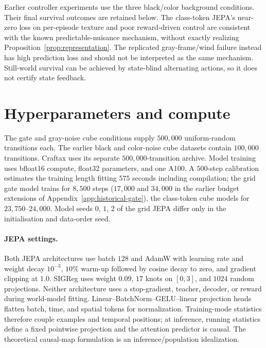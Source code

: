 Earlier controller experiments use the three black/color background conditions. Their final
survival outcomes are retained below. The class-token JEPA's near-zero loss on per-episode texture
and poor reward-driven control are consistent with the known predictable-nuisance mechanism,
without exactly realizing Proposition~\ref{prop:representation}. The replicated gray-frame/wind
failure instead has high prediction loss and should not be interpreted as the same mechanism.
Still-world survival can be achieved by state-blind alternating actions, so it does not certify
state feedback.

\begin{table}[ht]
\centering
\caption{Survival (percent) in the supplementary cube worlds. ``LeWM'' denotes the class-token JEPA;
``grid'' denotes the grid JEPA; ``goal'' and ``heads'' use latent-goal and learned-return search,
respectively. PPO columns use the final saved policies; ``px'' and ``z'' identify pixel and latent
observations. Still-world survival does not certify state feedback.}
\label{tab:cube}
\end{table}

\clearpage
\section{Hyperparameters and compute}
\label{app:hparams}

The gate and gray-noise cube conditions supply $500{,}000$ uniform-random transitions each. The earlier black and color-noise cube datasets contain $100{,}000$ transitions. Craftax uses its separate $500{,}000$-transition archive. Model training uses bfloat16 compute,
float32 parameters, and one A100. A $500$-step calibration estimates the training length fitting
$575$ seconds including compilation; the grid gate model trains for $8{,}500$ steps ($17{,}000$ and $34{,}000$ in the earlier budget extensions of Appendix~\ref{app:historical-gate}), the class-token cube models for $23{,}750$--$24{,}000$.
Model seeds $0$, $1$, $2$ of the grid JEPA differ only in the initialisation and data-order seed.

\paragraph{JEPA settings.}
Both JEPA architectures use batch $128$ and AdamW with learning rate and weight decay $10^{-3}$, $10\%$ warm-up
followed by cosine decay to zero, and gradient clipping at $1.0$. SIGReg uses weight $0.09$, $17$
knots on $[0,3]$, and $1024$ random projections. Neither architecture uses a stop-gradient, teacher, decoder, or
reward during world-model fitting. Linear--BatchNorm--GELU--linear projection heads flatten batch, time, and spatial tokens for normalization. Training-mode statistics therefore couple examples and temporal positions; at inference, running statistics define a fixed pointwise projection and the attention predictor is causal. The theoretical causal-map formulation is an inference/population idealization.

